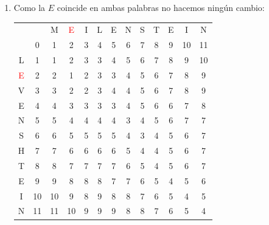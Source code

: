 \documentclass[10pt,a4paper,spanish]{report}
\theoremstyle{definition}
\theoremstyle{remark}
\begin{document}
\begin{enumerate}
\item Como la $E$ coincide en ambas palabras no hacemos ningún cambio:
\begin{center}
\begin{tabular}{c|c|c|c|c|c|c|c|c|c|c|c|c|}
\multicolumn{2}{r}{} & \multicolumn{1}{c}{M} & \multicolumn{1}{c}{\textcolor{Red}{E}} & \multicolumn{1}{c}{I} & \multicolumn{1}{c}{L} & \multicolumn{1}{c}{E} & \multicolumn{1}{c}{N} & \multicolumn{1}{c}{S} & \multicolumn{1}{c}{T} & \multicolumn{1}{c}{E} & \multicolumn{1}{c}{I} & \multicolumn{1}{c}{N} \\ 
\cline{2-13} 
& 0 & 1 & 2 & 3 & 4 & 5 & 6 & 7 & 8 & 9 & 10 & 11 \\
\cline{2-13}
L & 1 & \cellcolor{Cyan}1 & 2 & 3 & 3 & 4 & 5 & 6 & 7 & 8 & 9 & 10 \\
\cline{2-13} 
\textcolor{Red}{E} & 2 & 2 & \cellcolor{Green}1 & \cellcolor{Green}2 & 3 & 3 & 4 & 5 & 6 & 7 & 8 & 9 \\
\cline{2-13} 
V & 3 & 3 & 2 & 2 & \cellcolor{Green}3 & 4 & 4 & 5 & 6 & 7 & 8 & 9 \\
\cline{2-13} 
E & 4 & 4 & 3 & 3 & 3 & \cellcolor{Green}3 & 4 & 5 & 6 & 6 & 7 & 8 \\
\cline{2-13} 
N & 5 & 5 & 4 & 4 & 4 & 4 & \cellcolor{Green}3 & 4 & 5 & 6 & 7 & 7 \\
\cline{2-13} 
S & 6 & 6 & 5 & 5 & 5 & 5 & 4 & \cellcolor{Green}3 & 4 & 5 & 6 & 7 \\
\cline{2-13} 
H & 7 & 7 & 6 & 6 & 6 & 6 & 5 & \cellcolor{Green}4 & 4 & 5 & 6 & 7 \\
\cline{2-13} 
T & 8 & 8 & 7 & 7 & 7 & 7 & 6 & 5 & \cellcolor{Green}4 & 5 & 6 & 7 \\
\cline{2-13}
E & 9 & 9 & 8 & 8 & 8 & 7 & 7 & 6 & 5 & \cellcolor{Green}4 & 5 & 6 \\
\cline{2-13} 
I & 10 & 10 & 9 & 8 & 9 & 8 & 8 & 7 & 6 & 5 & \cellcolor{Green}4 & 5 \\
\cline{2-13} 
N & 11 & 11 & 10 & 9 & 9 & 9 & 8 & 8 & 7 & 6 & 5 & \cellcolor{Green}4 \\
\cline{2-13} 
\end{tabular}
\end{center}


\end{enumerate}
\end{document}
